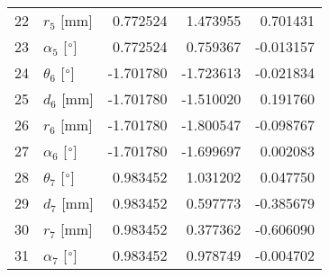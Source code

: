 \documentclass{standalone}%
\begin{document}
\begin{tabular}{llrrr}
22 &              $r_{5}$ [mm] &  0.772524 &   1.473955 &   0.701431 \\
23 &  $\alpha_{5}$ [$\degree$] &  0.772524 &   0.759367 &  -0.013157 \\
24 &  $\theta_{6}$ [$\degree$] & -1.701780 &  -1.723613 &  -0.021834 \\
25 &              $d_{6}$ [mm] & -1.701780 &  -1.510020 &   0.191760 \\
26 &              $r_{6}$ [mm] & -1.701780 &  -1.800547 &  -0.098767 \\
27 &  $\alpha_{6}$ [$\degree$] & -1.701780 &  -1.699697 &   0.002083 \\
28 &  $\theta_{7}$ [$\degree$] &  0.983452 &   1.031202 &   0.047750 \\
29 &              $d_{7}$ [mm] &  0.983452 &   0.597773 &  -0.385679 \\
30 &              $r_{7}$ [mm] &  0.983452 &   0.377362 &  -0.606090 \\
31 &  $\alpha_{7}$ [$\degree$] &  0.983452 &   0.978749 &  -0.004702 \\
\bottomrule
\end{tabular}
%
\end{document}
